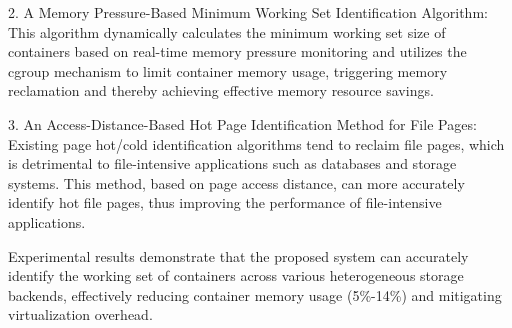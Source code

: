 \begin{englishabstract}
2. A Memory Pressure-Based Minimum Working Set Identification Algorithm: This algorithm dynamically calculates the minimum working set size of containers based on real-time memory pressure monitoring and utilizes the cgroup mechanism to limit container memory usage, triggering memory reclamation and thereby achieving effective memory resource savings.

3. An Access-Distance-Based Hot Page Identification Method for File Pages: Existing page hot/cold identification algorithms tend to reclaim file pages, which is detrimental to file-intensive applications such as databases and storage systems. This method, based on page access distance, can more accurately identify hot file pages, thus improving the performance of file-intensive applications.

Experimental results demonstrate that the proposed system can accurately identify the working set of containers across various heterogeneous storage backends, effectively reducing container memory usage (5\%-14\%) and mitigating virtualization overhead.


\end{englishabstract}



